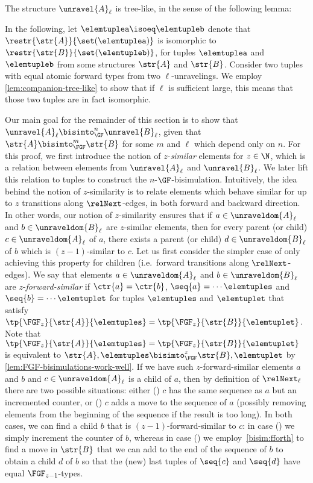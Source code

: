 \noindent
The structure $\unravel{A}_{\ell}$ is tree-like, in the sense of the following lemma:


In the following, let $\elemtuplea \isoeq \elemtupleb$ denote that $\restr{\str{A}}{\set(\elemtuplea)}$ is isomorphic to $\restr{\str{B}}{\set(\elemtupleb)}$, for tuples $\elemtuplea$ and $\elemtupleb$ from some structures $\str{A}$ and $\str{B}$.
Consider two tuples with equal atomic forward types from two $\ell$-unravelings.
We employ \cref{lem:companion-tree-like} to show that if $\ell$ is sufficient large, this means that those two tuples are in fact isomorphic.


Our main goal for the remainder of this section is to show that $\unravel{A}_{\ell} \bisimto_{\GF}^{n} \unravel{B}_{\ell}$, given that $\str{A} \bisimto_{\FGF}^{m} \str{B}$ for some $m$ and $\ell$ which depend only on $n$.
For this proof, we first introduce the notion of $z$-\emph{similar} elements for $z \in \N$, which is a relation between elements from $\unravel{A}_{\ell}$ and $\unravel{B}_{\ell}$.
We later lift this relation to tuples to construct the $n$-$\GF$-bisimulation.
Intuitively, the idea behind the notion of $z$-similarity is to relate elements which behave similar for up to $z$ transitions along $\relNext$-edges, in both forward and backward direction.
In other words, our notion of $z$-similarity ensures that if $a \in \unraveldom{A}_{\ell}$ and $b \in \unraveldom{B}_{\ell}$ are $z$-similar elements, then for every parent (or child) $c \in \unraveldom{A}_{\ell}$ of $a$, there exists a parent (or child) $d \in \unraveldom{B}_{\ell}$ of $b$ which is $(z{-}1)$-similar to $c$.
Let us first consider the simpler case of only achieving this property for children (i.e.\ forward transitions along $\relNext$-edges).
We say that elements $a \in \unraveldom{A}_{\ell}$ and $b \in \unraveldom{B}_{\ell}$ are $z$-\emph{forward-similar} if $\ctr{a} = \ctr{b}$, $\seq{a} = \cdots \elemtuples$ and $\seq{b} = \cdots \elemtuplet$ for tuples $\elemtuples$ and $\elemtuplet$ that satisfy $\tp{\FGF_{z}}{\str{A}}{\elemtuples} = \tp{\FGF_{z}}{\str{B}}{\elemtuplet}$.
Note that $\tp{\FGF_{z}}{\str{A}}{\elemtuples} = \tp{\FGF_{z}}{\str{B}}{\elemtuplet}$ is equivalent to $\str{A}, \elemtuples \bisimto_{\FGF}^{z} \str{B}, \elemtuplet$ by \cref{lem:FGF-bisimulations-work-well}.
If we have such $z$-forward-similar elements $a$ and $b$ and $c \in \unraveldom{A}_{\ell}$ is a child of $a$, then by definition of $\relNext_{\ell}$ there are two possible situations: either () $c$ has the same sequence as $a$ but an incremented counter, or () $c$ adds a move to the sequence of $a$ (possibly removing elements from the beginning of the sequence if the result is too long).
In both cases, we can find a child $b$ that is $(z{-}1)$-forward-similar to $c$: in case () we simply increment the counter of $b$, whereas in case () we employ~\ref{bisim:fforth} to find a move in $\str{B}$ that we can add to the end of the sequence of $b$ to obtain a child $d$ of $b$ so that the (new) last tuples of $\seq{c}$ and $\seq{d}$ have equal $\FGF_{z{-}1}$-types.

